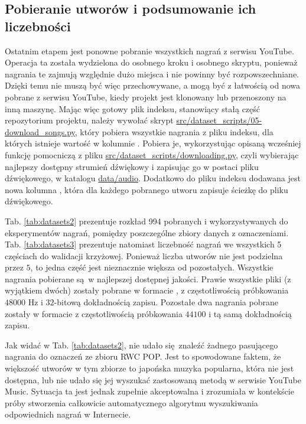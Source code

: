 \subsection{Pobieranie utworów i podsumowanie ich liczebności}

Ostatnim etapem jest ponowne pobranie wszystkich nagrań z serwisu YouTube. Operacja ta została wydzielona do osobnego kroku i osobnego skryptu, ponieważ nagrania te zajmują względnie dużo miejsca i nie powinny być rozpowszechniane. Dzięki temu nie muszą być więc przechowywane, a mogą być z łatwością od nowa pobrane z serwisu YouTube, kiedy projekt jest klonowany lub przenoszony na inną maszynę. Mając więc gotowy plik indeksu, stanowiący stałą część repozytorium projektu, należy wywołać skrypt \url{src/dataset_scripts/05-download_songs.py}, który pobiera wszystkie nagrania z pliku indeksu, dla których istnieje wartość w kolumnie . Pobiera je, wykorzystując opisaną wcześniej funkcję pomocniczą z pliku \url{src/dataset_scripts/downloading.py}, czyli wybierając najlepszy dostępny strumień dźwiękowy i zapisując go w postaci pliku dźwiękowego, w katalogu \url{data/audio}. Dodatkowo do pliku indeksu dodawana jest nowa kolumna , która dla każdego pobranego utworu zapisuje ścieżkę do pliku dźwiękowego.

Tab. \ref{tab:datasets2} prezentuje rozkład 994 pobranych i wykorzystywanych do eksperymentów nagrań, pomiędzy poszczególne zbiory danych z oznaczeniami. Tab. \ref{tab:datasets3} prezentuje natomiast liczebność nagrań we wszystkich 5 częściach do walidacji krzyżowej. Ponieważ liczba utworów nie jest podzielna przez $5$, to jedna część jest nieznacznie większa od pozostałych.  Wszystkie nagrania pobierane są w najlepszej dostępnej jakości. Prawie wszystkie pliki (z wyjątkiem dwóch) zostały pobrane w formacie , z częstotliwością próbkowania $48000$ Hz i $32$-bitową dokładnością zapisu. Pozostałe dwa nagrania pobrane zostały w formacie  z częstotliwością próbkowania $44100$ i tą samą dokładnością zapisu.

Jak widać w Tab. \ref{tab:datasets2}, nie udało się znaleźć żadnego pasującego nagrania do oznaczeń ze zbioru RWC POP. Jest to spowodowane faktem, że większość utworów w tym zbiorze to japońska muzyka popularna, która nie jest dostępna, lub nie udało się jej wyszukać zastosowaną metodą w serwisie YouTube Music. Sytuacja ta jest jednak zupełnie akceptowalna i zrozumiała w kontekście próby stworzenia całkowicie automatycznego algorytmu wyszukiwania odpowiednich nagrań w Internecie.

